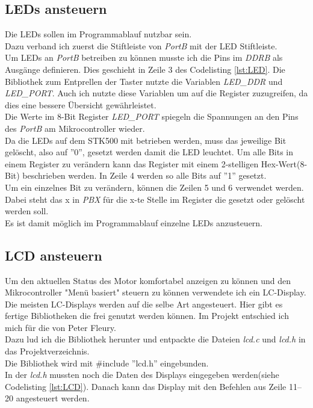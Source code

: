 \subsection{LEDs ansteuern}
\label{sec:LED}
Die LEDs sollen im Programmablauf nutzbar sein.\\
Dazu verband ich zuerst die Stiftleiste von \emph{PortB} mit der LED Stiftleiste.\\
Um LEDs an \emph{PortB} betreiben zu können musste ich die Pins im  \emph{DDRB} als Ausgänge definieren. Dies geschieht in Zeile 3 des Codelisting \ref{lst:LED}. Die Bibliothek zum Entprellen der Taster nutzte die Variablen \emph{LED\_DDR} und \emph{LED\_PORT}. Auch ich nutzte diese Variablen um auf die Register zuzugreifen, da dies eine bessere Übersicht gewährleistet.\\
Die Werte im 8-Bit Register \emph{LED\_PORT} spiegeln die Spannungen an den Pins des \emph{PortB} am Mikrocontroller wieder.\\
Da die LEDs auf dem STK500 mit  betrieben werden, muss das jeweilige Bit gelöscht, also auf ''0'', gesetzt werden damit die LED leuchtet.
Um alle Bits in einem Register zu verändern kann das Register mit einem 2-stelligen Hex-Wert(8-Bit) beschrieben werden. In Zeile 4 werden so alle Bits auf ''1'' gesetzt.\\
Um ein einzelnes Bit zu verändern, können die Zeilen 5 und 6 verwendet werden. Dabei steht das x in \emph{PBX} für die x-te Stelle im Register die gesetzt oder gelöscht werden soll.\\
Es ist damit möglich im Programmablauf einzelne LEDs anzusteuern.

\lstset{language=C, basicstyle=\footnotesize, showstringspaces=false, tabsize=8}


\subsection{LCD ansteuern}
\label{sec:LCD}
Um den aktuellen Status des Motor komfortabel anzeigen zu können und den Mikrocontroller "Menü basiert" steuern zu können verwendete ich ein LC-Display.\\
Die meisten LC-Displays werden auf die selbe Art angesteuert. Hier gibt es fertige Bibliotheken die frei genutzt werden können. Im Projekt entschied ich mich für die von Peter Fleury\cite{uC:Fleury}.\\
Dazu lud ich die Bibliothek herunter und entpackte die Dateien \emph{lcd.c} und \emph{lcd.h} in das Projektverzeichnis. \\
Die Bibliothek wird mit \#include ''lcd.h'' eingebunden.\\
In der \emph{lcd.h} mussten noch die Daten des Displays eingegeben werden(siehe Codelisting \ref{lst:LCD}).
Danach kann das Display mit den Befehlen aus Zeile 11--20 angesteuert werden.

